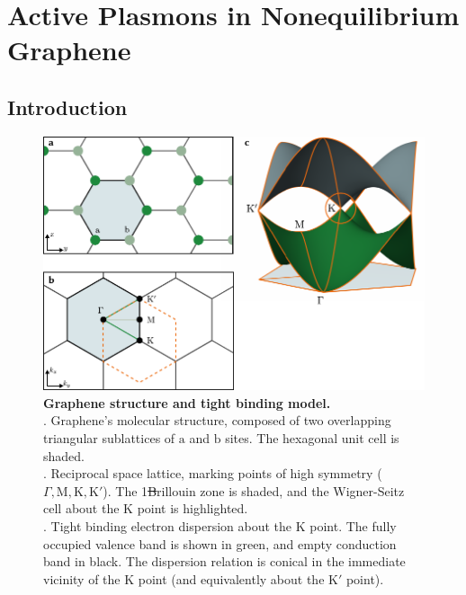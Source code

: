 \chapter{Active Plasmons in Nonequilibrium Graphene}

\section{Introduction} \label{sec:grIntro}

\begin{figure}
 \includegraphics{figs/gr/TB.pdf}
 \caption[Graphene structure and tight binding model]{
\label{fig:Tb} \textbf{Graphene structure and tight binding model.}\small\\
\subA. Graphene's molecular structure, composed of two overlapping triangular
sublattices of $\mathrm{a}$ and $\mathrm{b}$ sites.
The hexagonal unit cell is shaded.
\\
\subB. Reciprocal space lattice, marking points of high symmetry
($\Gamma, \mathrm{M}, \mathrm{K}, \mathrm{K'}$).
The 1\st Brillouin zone is shaded, and the Wigner-Seitz cell about the
$\mathrm{K}$ point is highlighted.
\\
\subC. Tight binding electron dispersion about the $\mathrm{K}$ point.
The fully occupied valence band is shown in green, and empty conduction band in
black.
The dispersion relation is conical in the immediate vicinity of the
$\mathrm{K}$ point (and equivalently about the $\mathrm{K'}$ point).
}
\end{figure}

